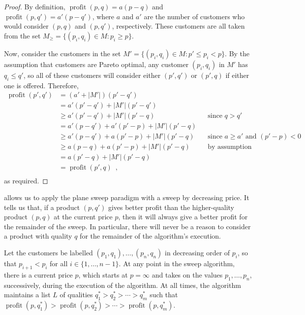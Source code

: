 \documentclass[lotsofwhite]{patmorin}
\newcommand{\val}{\operatorname{profit}}
\begin{document}
\begin{proof}
  By definition, $\val(p,q) = a(p-q)$ and $\val(p,q') = a'(p-q')$, where
  $a$ and $a'$ are the number of customers who would consider $(p,q)$
  and $(p,q')$, respectively.  These customers are all taken from the
  set $M_\ge =\{(p_i,q_i)\in M: p_i \ge p\}$.

  Now, consider the customers in the set $M'=\{(p_i,q_i)\in M: p' \le
  p_i < p\}$.  By the assumption that customers are Pareto optimal,
  any customer $(p_i,q_i)$ in $M'$ has $q_i \le q'$, so all of these
  customers will consider either $(p',q')$ or $(p',q)$ if either one
  is offered.  Therefore,
  \[
    \begin{aligned}
      \val(p',q')
        &  =   (a'+|M'|)(p'-q') \\
        &  =   a'(p'-q') + |M'|(p'-q') \\
        & \ge  a'(p'-q') + |M'|(p'-q) 
               && \mbox{since $q > q'$} \\
        &  =   a'(p-q') + a'(p'-p) + |M'|(p'-q) \\
        & \ge  a'(p-q') + a(p'-p) + |M'|(p'-q) 
               && \mbox{since $a \ge a'$ and $(p'-p) < 0$} \\
        & \ge  a(p-q) + a(p'-p) + |M'|(p'-q) 
               && \mbox{by assumption} \\
        &  =  a(p'-q) + |M'|(p'-q) \\
        &  =  \val(p',q) \enspace , \\
    \end{aligned}
  \]
  as required.
\end{proof}

 allows us to apply the plane sweep paradigm with a sweep
by decreasing price.  It tells us that, if a product $(p,q')$ gives better
profit than the higher-quality product $(p,q)$ at the current price $p$,
then it will always give a better profit for the remainder of the sweep.
In particular, there will never be a reason to consider a product with
quality $q$ for the remainder of the algorithm's execution.

Let the customers be labelled $(p_1,q_1),\ldots,(p_n,q_n)$ in decreasing
order of $p_i$, so that $p_{i+1} < p_i$ for all $i\in\{1,\ldots,n-1\}$.
At any point in the sweep algorithm, there is a current price $p$,
which starts at $p=\infty$ and takes on the values $p_1,\ldots,p_n$,
successively, during the execution of the algorithm.  At all times, the
algorithm maintains a list $L$ of qualities $q_1^* > q_2^* > \cdots >
q_m^*$ such that $\val(p,q_1^*) > \val(p,q_2^*) >\cdots>\val(p,q_m^*)$.
\end{document}
